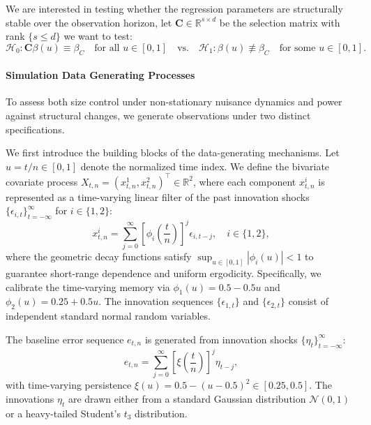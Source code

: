 \documentclass[10pt, a4paper]{article}
\theoremstyle{assumption}
\theoremstyle{definition}
\theoremstyle{theorem}
\begin{document}
We are interested in testing whether the regression parameters are structurally stable over the observation horizon, let $\mathbf{C} \in \mathbb{R}^{s\times d}$ be the selection matrix with rank $\{s \le d\}$ we want to test:
\begin{equation*}
    \mathcal{H}_0: \mathbf{C}\beta(u) \equiv \beta_C \quad \text{for all } u \in [0, 1] \quad \text{vs.} \quad \mathcal{H}_1: \beta(u) \not\equiv \beta_C \quad \text{for some } u \in [0, 1].
\end{equation*}

\paragraph{Simulation Data Generating Processes}
To assess both size control under non-stationary nuisance dynamics and power against structural changes, we generate observations under two distinct specifications.

We first introduce the building blocks of the data-generating mechanisms. Let $u = t/n \in [0, 1]$ denote the normalized time index. We define the bivariate covariate process $X_{t,n} = (x^1_{t,n}, x^2_{t,n})^\top \in \mathbb{R}^2$, where each component $x^i_{t,n}$ is represented as a time-varying linear filter of the past innovation shocks $\{\epsilon_{i,t}\}_{t=-\infty}^\infty$ for $i \in \{1, 2\}$:
\begin{equation*}
    x^i_{t,n} = \sum_{j=0}^\infty \left[\phi_i\left(\frac{t}{n}\right)\right]^j \epsilon_{i,t-j}, \quad i \in \{1, 2\},
\end{equation*}
where the geometric decay functions satisfy $\sup_{u \in [0, 1]} |\phi_i(u)| < 1$ to guarantee short-range dependence and uniform ergodicity. Specifically, we calibrate the time-varying memory via $\phi_1(u) = 0.5 - 0.5u$ and $\phi_2(u) = 0.25 + 0.5u$. The innovation sequences $\{\epsilon_{1,t}\}$ and $\{\epsilon_{2,t}\}$ consist of independent standard normal random variables.

The baseline error sequence $e_{t,n}$ is generated from innovation shocks $\{\eta_t\}_{t=-\infty}^\infty$:
\begin{equation*}
    e_{t,n} = \sum_{j=0}^\infty \left[\xi\left(\frac{t}{n}\right)\right]^j \eta_{t-j},
\end{equation*}
with time-varying persistence $\xi(u) = 0.5 - (u - 0.5)^2 \in [0.25, 0.5]$. The innovations $\eta_t$ are drawn either from a standard Gaussian distribution $\mathcal{N}(0, 1)$ or a heavy-tailed Student's $t_3$ distribution.
\end{document}
